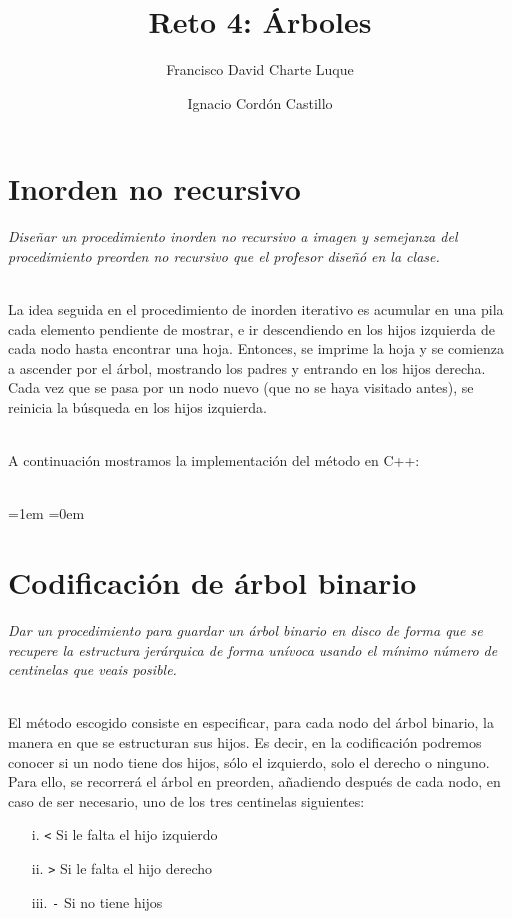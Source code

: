 \documentclass[a4paper,10pt]{scrartcl}
\title{Reto 4: Árboles}
\author{Francisco David Charte Luque\and
        Ignacio Cordón Castillo}
\date{}
\begin{document}
\maketitle
\section{Inorden no recursivo}
        \textit{Diseñar un procedimiento inorden no recursivo a imagen y semejanza
        del procedimiento preorden no recursivo que el profesor diseñó en la clase.}\\\
 
 La idea seguida en el procedimiento de inorden iterativo es acumular en una pila
 cada elemento pendiente de mostrar, e ir descendiendo en los hijos izquierda de cada nodo
 hasta encontrar una hoja. Entonces, se imprime la hoja y se comienza a ascender
 por el árbol, mostrando los padres y entrando en los hijos derecha. Cada vez que se pasa por un
 nodo nuevo (que no se haya visitado antes), se reinicia la búsqueda en los hijos izquierda.\\\
 
 A continuación mostramos la implementación del método en C++:\\\
 
 \leftskip=1em
 \small
 \texttt{}
 \normalsize
 \leftskip=0em
 
 \section{Codificación de árbol binario}
         \textit{Dar un procedimiento para guardar un árbol binario en disco de forma que se
         recupere la estructura jerárquica de forma unívoca usando el mínimo número
         de centinelas que veais posible.}\\\
 
 
 El método escogido consiste en especificar, para cada nodo del árbol binario, 
 la manera en que se estructuran sus hijos. Es decir, en la codificación 
 podremos conocer si un nodo tiene dos hijos, sólo el
 izquierdo, solo el derecho o ninguno. Para ello, se recorrerá el árbol en preorden,
 añadiendo después de cada nodo, en caso de ser necesario, uno
 de los tres centinelas siguientes:
  
 \begin{enumerate}
 \item[i.] \texttt{<} Si le falta el hijo izquierdo
 \item[ii.] \texttt{>} Si le falta el hijo derecho
 \item[iii.] \texttt{-} Si no tiene hijos
 \end{enumerate}
 
\end{document}
